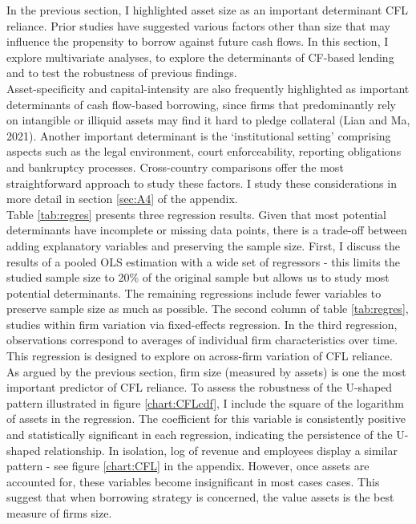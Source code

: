 \documentclass[12pt]{article}
\begin{document}
In the previous section, I highlighted asset size as an important determinant CFL reliance. Prior studies have suggested various factors other than size that may influence the propensity to borrow against future cash flows. In this section, I explore multivariate analyses, to explore the determinants of CF-based lending and to test the robustness of previous findings. \vspace{3mm} \\
Asset-specificity and capital-intensity are also frequently highlighted as important determinants of cash flow-based borrowing, since firms that predominantly rely on intangible or illiquid assets may find it hard to pledge collateral (Lian and Ma, 2021). Another important determinant is the `institutional setting' comprising aspects such as the legal environment, court enforceability, reporting obligations and bankruptcy processes. Cross-country comparisons offer the most straightforward approach to study these factors. I study these considerations in more detail in section \ref{sec:A4} of the appendix.
 \vspace{3mm} \\
Table \ref{tab:regres} presents three regression results. Given that most potential determinants have incomplete or missing data points, there is a trade-off between adding explanatory variables and preserving the sample size. First, I discuss the results of a pooled OLS estimation with a wide set of regressors - this limits the studied sample size to 20\% of the original sample but allows us to study most potential determinants. The remaining regressions include fewer variables to preserve sample size as much as possible. The second column of table \ref{tab:regres}, studies within firm variation via fixed-effects regression. In the third regression, observations correspond to averages of individual firm characteristics over time. This regression is designed to explore on across-firm variation of CFL reliance. \vspace{3mm} \\
As argued by the previous section, firm size (measured by assets) is one the most important predictor of CFL reliance. To assess the robustness of the U-shaped pattern illustrated in figure \ref{chart:CFLcdf}, I include the square of the logarithm of assets in the regression. The coefficient for this variable is consistently positive and statistically significant in each regression, indicating the persistence of the U-shaped relationship. In isolation, log of revenue and employees display a similar pattern - see figure \ref{chart:CFL} in the appendix. However, once assets are accounted for, these variables become insignificant in most cases cases. This suggest that when borrowing strategy is concerned, the value assets is the best measure of firms size. \vspace{3mm} \\
\end{document}
